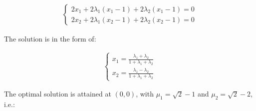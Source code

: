 \documentclass[11pt, letterpaper, titlepage]{article}
\begin{document}
\begin{enumerate}
\begin{enumerate}
\begin{enumerate}
            \begin{gather*}
                \begin{cases}
                    2 x_1 + 2 \lambda_1 (x_1 - 1) + 2 \lambda_2 (x_1 - 1) = 0 \\
                    2 x_2 + 2 \lambda_1 (x_2 - 1) + 2 \lambda_2 (x_2 - 1) = 0
                \end{cases}
            \end{gather*}
            
        \end{enumerate}
        
        The solution is in the form of:
            
        \begin{gather*}
            \begin{cases}
                x_1 = \frac{\lambda_1 + \lambda_2}{1 + \lambda_1 + \lambda_2} \\
                x_2 = \frac{\lambda_1 - \lambda_2}{1 + \lambda_1 + \lambda_2}
            \end{cases}
        \end{gather*}
        
        \newpage
        
        The optimal solution is attained at $(0, 0)$, with $\mu_1 = \sqrt{2} - 1$ and $\mu_2 = \sqrt{2} - 2$, i.e.:
        
        \begin{center}
        \def\circlec{(1, 1) circle (sqrt(2)}
        \def\circled{(1, -1) circle (sqrt(2)}
        \end{center}
        

\end{enumerate}
\end{enumerate}
\end{document}
